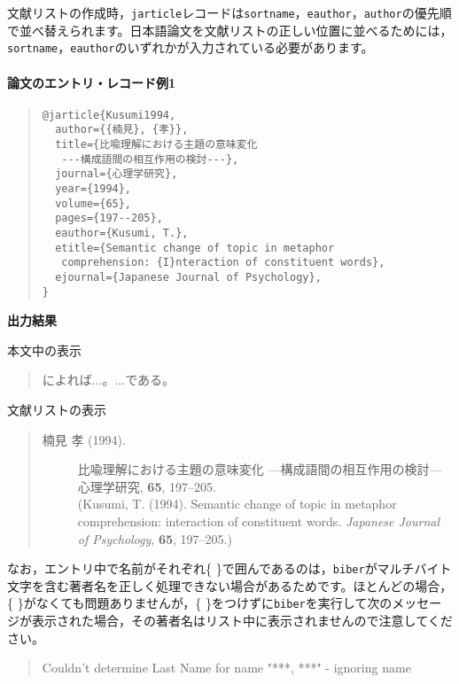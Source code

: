 \documentclass[12pt]{ltjsarticle}
\begin{document}
文献リストの作成時，\texttt{jarticle}レコードは\texttt{sortname}，\texttt{eauthor}，\texttt{author}の優先順で並べ替えられます。日本語論文を文献リストの正しい位置に並べるためには，\texttt{sortname}，\texttt{eauthor}のいずれかが入力されている必要があります。


\paragraph{論文のエントリ・レコード例1}

\begin{quote}
\begin{verbatim}
@jarticle{Kusumi1994,
  author={{楠見}, {孝}},
  title={比喩理解における主題の意味変化
   ---構成語間の相互作用の検討---},
  journal={心理学研究},
  year={1994},
  volume={65},
  pages={197--205},
  eauthor={Kusumi, T.},
  etitle={Semantic change of topic in metaphor 
   comprehension: {I}nteraction of constituent words},
  ejournal={Japanese Journal of Psychology},
}
\end{verbatim}
\end{quote}


\textbf{出力結果}

本文中の表示
\begin{quote}
\textcite{Kusumi1994}によれば...。...である\parencite{Kusumi1994}。
\end{quote}


文献リストの表示

\begin{quote}
\begin{description}
  \item[\textrm{楠見 孝 (1994).}]比喩理解における主題の意味変化 ---構成語間の相互作用の検討---　心理学研究, \textbf{65}, 197--205.\\
(Kusumi, T. (1994). Semantic change of topic in metaphor comprehension: interaction of constituent words. \textit{Japanese Journal of Psychology}, \textbf{65}, 197--205.)
\end{description}
\end{quote}

なお，エントリ中で名前がそれぞれ\{ \}で囲んであるのは，\texttt{biber}がマルチバイト文字を含む著者名を正しく処理できない場合があるためです。ほとんどの場合，\{ \}がなくても問題ありませんが，\{ \}をつけずに\texttt{biber}を実行して次のメッセージが表示された場合，その著者名はリスト中に表示されませんので注意してください。

\begin{quotation}
  Couldn't determine Last Name for name "***, ***" - ignoring name
\end{quotation}
\end{document}
